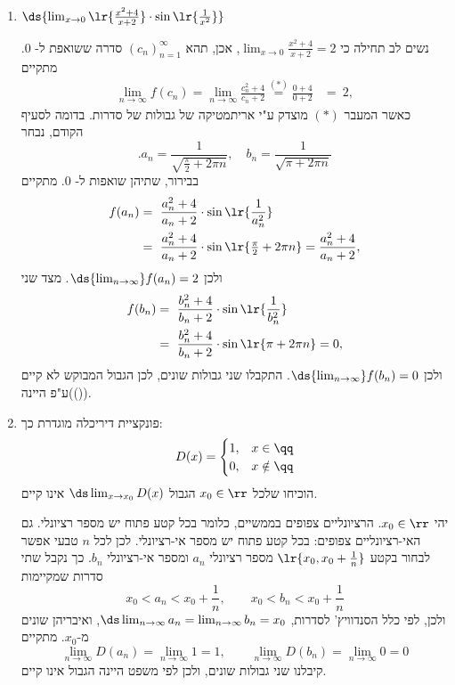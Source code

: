 \begin{enumerate}
\item $\ds{\lim_{x \to 0} \lr{ \frac{x^2+4}{x+2} } \cdot \sin\lr{ \frac{1}{x^2} } }$
\ifsol
{}
\begin{solbox}
נשים לב תחילה כי
$\displaystyle\lim_{x\to0}\frac{x^2+4}{x+2}=2$,
אכן, תהא
$(c_n)_{n=1}^\infty$
סדרה ששואפת ל-
$0$.
מתקיים
\begin{align*}
    \lim_{n\to\infty}f(c_n)=\lim_{n\to\infty}\frac{c_n^2+4}{c_n+2}
    \overset{(\ast)}{=} \frac{0+4}{0+2}
    &=\ 2,
\end{align*}
כאשר המעבר
$(\ast)$
מוצדק ע"י אריתמטיקה של גבולות של סדרות.
בדומה לסעיף הקודם, נבחר
$$.a_n=\frac{1}{\sqrt{\tfrac{\pi}{2}+2\pi n}}
,\quad b_n=\frac{1}{\sqrt{\pi+2\pi n}}$$
בבירור, שתיהן שואפות ל-
$0$.
מתקיים
\begin{align*}
f(a_n)
&=\ \frac{a_n^2+4}{a_n+2}  \cdot \sin\lr{ \frac{1}{a_n^2} }\\
&=\ \frac{a_n^2+4}{a_n+2} \cdot \sin\lr{\tfrac{\pi}{2}+2\pi n}
= \frac{a_n^2+4}{a_n+2},
\end{align*}
ולכן
$\ds{\lim_{n\to\infty}}f(a_n)=2$.
מצד שני
\begin{align*}
f(b_n)
&=\ \frac{b_n^2+4}{b_n+2} \cdot \sin\lr{ \frac{1}{b_n^2} }\\
&=\ \frac{b_n^2+4}{b_n+2}  \cdot \sin\lr{\pi+2\pi n}
= 0,
\end{align*}
ולכן
$\ds{\lim_{n\to\infty}}f(b_n)=0$.
התקבלו שני גבולות שונים, לכן הגבול המבוקש לא קיים
())ע"פ היינה).
\end{solbox}
\fi
\item פונקציית דיריכלה מוגדרת כך:
\[D(x)=\begin{cases}1, & x\in\qq\\ 0, & x\notin\qq\end{cases}\]
הוכיחו שלכל $x_0\in\rr$ הגבול $\ds\lim_{x\to x_0}D(x)$ אינו קיים.
\ifsol
{}
\begin{solbox}
יהי $x_0\in\rr$. הרציונליים צפופים בממשיים, כלומר בכל קטע פתוח יש מספר רציונלי. גם האי-רציונליים צפופים: בכל קטע פתוח יש מספר אי-רציונלי. לכן לכל $n$ טבעי אפשר לבחור בקטע $\lr{x_0,x_0+\frac1n}$ מספר רציונלי $a_n$ ומספר אי-רציונלי $b_n$. כך נקבל שתי סדרות שמקיימות
\[x_0<a_n<x_0+\frac1n,\qquad x_0<b_n<x_0+\frac1n\]
ולכן, לפי כלל הסנדוויץ' לסדרות, $\ds\lim_{n\to\infty}a_n=\lim_{n\to\infty}b_n=x_0$, ואיבריהן שונים מ-$x_0$. מתקיים
\[\lim_{n\to\infty}D(a_n)=\lim_{n\to\infty}1=1,\qquad \lim_{n\to\infty}D(b_n)=\lim_{n\to\infty}0=0\]
קיבלנו שני גבולות שונים, ולכן לפי משפט היינה הגבול אינו קיים.
\end{solbox}
\fi


\end{enumerate}
